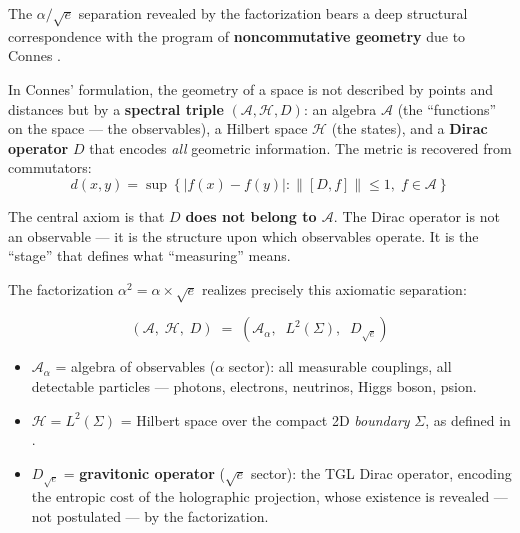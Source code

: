 \documentclass[12pt,a4paper,twoside]{article}
\newcommand{\alphaii}{\alpha^{2}}
\newcommand{\boundary}{\textit{boundary}}
\begin{document}
The $\alpha / \sqrt{e}$ separation revealed by the factorization bears a deep structural correspondence with the program of \textbf{noncommutative geometry} due to Connes \cite{Connes1994, Connes1996}.

In Connes' formulation, the geometry of a space is not described by points and distances but by a \textbf{spectral triple} $(\mathcal{A}, \mathcal{H}, D)$: an algebra $\mathcal{A}$ (the ``functions'' on the space --- the observables), a Hilbert space $\mathcal{H}$ (the states), and a \textbf{Dirac operator} $D$ that encodes \textit{all} geometric information. The metric is recovered from commutators:
\begin{equation}
d(x,y) = \sup\left\{|f(x) - f(y)| : \|[D, f]\| \leq 1,\; f \in \mathcal{A}\right\}
\label{eq:connes_distance}
\end{equation}

The central axiom is that $D$ \textbf{does not belong to $\mathcal{A}$}. The Dirac operator is not an observable --- it is the structure upon which observables operate. It is the ``stage'' that defines what ``measuring'' means.

The factorization $\alphaii = \alpha \times \sqrt{e}$ realizes precisely this axiomatic separation:

\begin{factorbox}[title={TGL Spectral Triple}]
\begin{equation}
(\mathcal{A},\; \mathcal{H},\; D) \;=\; \left(\mathcal{A}_\alpha,\;\; L^2(\Sigma),\;\; D_{\sqrt{e}}\right)
\label{eq:tripla}
\end{equation}

\begin{itemize}[nosep]
\item $\mathcal{A}_\alpha$ = algebra of observables ($\alpha$ sector): all measurable couplings, all detectable particles --- photons, electrons, neutrinos, Higgs boson, psion.

\item $\mathcal{H} = L^2(\Sigma)$ = Hilbert space over the compact 2D \boundary{} $\Sigma$, as defined in \cite{Miguel2026Graviton}.

\item $D_{\sqrt{e}}$ = \textbf{gravitonic operator} ($\sqrt{e}$ sector): the TGL Dirac operator, encoding the entropic cost of the holographic projection, whose existence is revealed --- not postulated --- by the factorization.
\end{itemize}
\end{factorbox}
\end{document}
